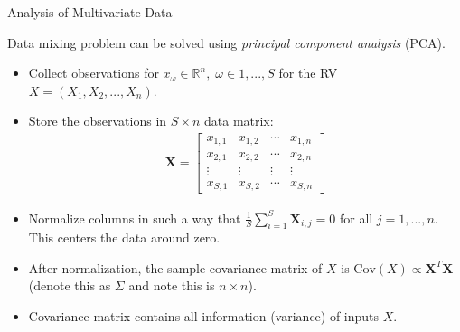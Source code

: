 \documentclass[9pt]{beamer}
\begin{document}
%
\begin{frame}{Analysis of Multivariate Data}

Data mixing problem can be solved using {\em principal component analysis} (PCA). 

\begin{itemize}
\setlength{\itemsep}{10pt}
\item Collect observations for $x_\omega\in \mathbb{R}^n,\; \omega \in 1,...,S$ for the RV $X=(X_1,X_2,...,X_n)$.  
\item Store the observations in $S\times n$ data matrix: 
\begin{align*}
\mathbf{X}=\left[\begin{array}{ccccccc}x_{1,1}&x_{1,2}&\cdots &x_{1,n}\\
x_{2,1}&x_{2,2}&\cdots &x_{2,n}\\
\vdots&\vdots&\vdots &\vdots\\
x_{S,1}&x_{S,2}&\cdots&x_{S,n}
\end{array}
\right]
\end{align*}
\item Normalize columns in such a way that $\frac{1}{S}\sum_{i=1}^S\mathbf{X}_{i,j}=0$ for all $j=1,...,n$.  This centers the data around zero. 
\item After normalization, the sample covariance matrix of $X$ is $\textrm{Cov}(X)\propto \mathbf{X}^T\mathbf{X}$ (denote this as $\Sigma$ and note this is $n\times n$). 
\item Covariance matrix contains all information (variance) of inputs $X$. 


\end{itemize}


\end{frame}
\end{document}
